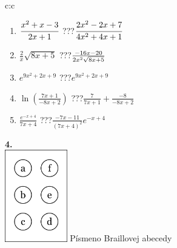 \documentclass[10pt]{report}
\begin{document}
\begin{tabular}{c:c}
\begin{minipage}[c][104.5mm][t]{0.5\linewidth}
\begin{center}
\begin{minipage}{0.79\linewidth}
\begin{center}
\begin{varwidth}{\linewidth}
\begin{enumerate}
\item $\cfrac{x^2+x-3}{2x+1}$\quad \dotfill\; ???\;\dotfill \quad $\cfrac{2x^2-2x+7}{4x^2+4x+1}$
\item $\frac{2}{x}\sqrt{8x+5}$\quad \dotfill\; ???\;\dotfill \quad $\frac{-16x-20}{2x^2 \sqrt{\smash[b]{8x+5}}}$
\item $e^{9x^2+2x+9}$\quad \dotfill\; ???\;\dotfill \quad $e^{9x^2+2x+9}$
\item $\ln{\left(\frac{7x+1}{-8x+2}\right)}$\quad \dotfill\; ???\;\dotfill \quad $\frac{7}{7x+1}+\frac{-8}{-8x+2}$
\item $\frac{e^{-x+4}}{7x+4}$\quad \dotfill\; ???\;\dotfill \quad $\frac{-7x-11}{(7x+4)^2}e^{-x+4}$
\end{enumerate}
\end{varwidth}
\end{center}
\end{minipage}
\begin{minipage}{0.20\linewidth}
\begin{center}
{\Huge\bfseries 4.} \\[2mm]
\includegraphics[height=40mm]{../images/braille.png}
{\small Písmeno Braillovej abecedy}
\end{center}
\end{minipage}
\end{center}
\end{minipage}
%
\end{tabular}
\newpage
\thispagestyle{empty}
\end{document}
